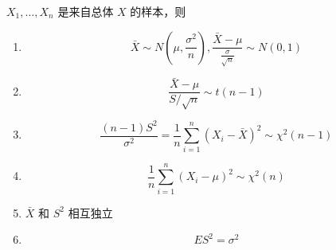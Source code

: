 $X_1, \ldots, X_n$ 是来自总体 $X$ 的样本，则

\begin{enumerate}
    \item $$\bar{X} \sim N\left(\mu, \frac{\sigma^2}{n}\right), \frac{\bar{X}-\mu}{\frac{\sigma}{\sqrt{n}}} \sim N(0, 1)$$
    \item $$\frac{ \bar{X} - \mu}{S/{\sqrt{n}}} \sim t(n-1)$$
    \item $$\frac{(n-1)S^2}{\sigma^2} = \frac{1}{n} \sum_{i=1}^n (X_i-\bar{X})^2 \sim \chi^2(n-1)$$
    \item $$\frac{1}{n} \sum_{i=1}^n (X_i-\mu)^2 \sim \chi^2(n)$$
    \item $\bar{X}$ 和 $S^2$ 相互独立
    \item $$ES^2 = \sigma^2$$
\end{enumerate}
